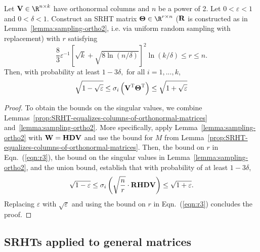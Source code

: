 \begin{lemma}
\label{lemma:SRHT-preserves-geometry2}
Let $\matV \in \R^{n \times k}$ have orthonormal columns and $n$ be a power of 2. Let $0 < \varepsilon < 1$ and $0 < \delta < 1.$
Construct an SRHT matrix $\matTh \in \R^{r \times n}$ (${\bm{\mathrm{R}}}$ is constructed as in Lemma~\ref{lemma:sampling-ortho2}, i.e. via
uniform random sampling with replacement) with $r$ satisfying
\begin{equation}\label{eqn:r4}
\frac{8}{3} \varepsilon^{-1} \left[\sqrt{k} + \sqrt{8\ln(n/\delta)} \right]^2 \ln (k/\delta) \leq r \leq n.
\end{equation}
Then, with probability at least $1-3\delta,$ for all $i=1,...,k$,
$$
\sqrt{1 - \sqrt{\varepsilon}} \le \sigma_i\left( {\bm{\mathrm{V}}} ^{\textsc{T}} {\bm{\mathrm{\Theta}}}^{\textsc{T}} \right) \le \sqrt{1 + \sqrt{\varepsilon}}
$$
\end{lemma}
\begin{proof}
To obtain the bounds on the singular values, we combine Lemmas~\ref{prop:SRHT-equalizes-columns-of-orthonormal-matrices} and~\ref{lemma:sampling-ortho2}.
More specifically, apply Lemma~\ref{lemma:sampling-ortho2} with ${\bm{\mathrm{W}}} = {\bm{\mathrm{H}}} {\bm{\mathrm{D}}} {\bm{\mathrm{V}}}$ and use the bound for $M$ from Lemma~\ref{prop:SRHT-equalizes-columns-of-orthonormal-matrices}. Then, the bound on $r$ in Eqn.~(\ref{eqn:r3}), the bound on the singular values in Lemma~\ref{lemma:sampling-ortho2},
and the union bound, establish that with probability of at least $1 - 3\delta$,
$$  \sqrt{1-\varepsilon} \le \sigma_i\left( \sqrt{{n\over r}} \cdot {\ensuremath{\bm{\mathrm{R}}}} {\ensuremath{\bm{\mathrm{H}}}} {\ensuremath{\bm{\mathrm{D}}}} {\ensuremath{\bm{\mathrm{V}}}} \right) \le  \sqrt{1+\varepsilon}  .$$
Replacing $\varepsilon$ with $\sqrt{\varepsilon}$ and using the bound on $r$ in Eqn.~(\ref{eqn:r3}) concludes the proof.

\end{proof}


\subsection{SRHTs applied to general matrices}
\label{sec:SRHT-orthogonal}

